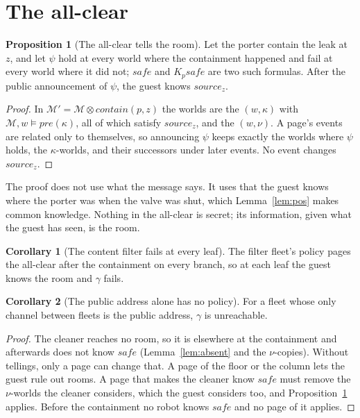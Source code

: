 \documentclass[11pt,a4paper]{article}
\theoremstyle{definition}
\newtheorem{proposition}{Proposition}
\newtheorem{corollary}{Corollary}
\newcommand{\Mod}{\mathcal{M}}
\newcommand{\prd}{\otimes}
\newcommand{\pre}{\mathit{pre}}
\newcommand{\safe}{\mathit{safe}}
\newcommand{\src}[1]{\mathit{source}_{#1}}
\begin{document}
\section{The all-clear}
\label{sec:allclear}

\begin{proposition}[The all-clear tells the room]
\label{prop:allclear}
Let the porter contain the leak at $z$, and let $\psi$ hold at every world
where the containment happened and fail at every world where it did not;
$\safe$ and $K_p\safe$ are two such formulas. After the public announcement of
$\psi$, the guest knows $\src{z}$.
\end{proposition}

\begin{proof}
In $\Mod' = \Mod \prd \mathit{contain}(p, z)$ the worlds are the $(w, \kappa)$
with $\Mod, w \models \pre(\kappa)$, all of which satisfy $\src{z}$, and the
$(w, \nu)$. A page's events are related only to themselves, so announcing
$\psi$ keeps exactly the worlds where $\psi$ holds, the $\kappa$-worlds, and
their successors under later events. No event changes $\src{z}$.
\end{proof}

The proof does not use what the message says. It uses that the guest knows where
the porter was when the valve was shut, which Lemma~\ref{lem:pos} makes common
knowledge. Nothing in the all-clear is secret; its information, given what the
guest has seen, is the room.

\begin{corollary}[The content filter fails at every leaf]
\label{cor:filter}
The filter fleet's policy pages the all-clear after the containment on every
branch, so at each leaf the guest knows the room and $\gamma$ fails.
\end{corollary}

\begin{corollary}[The public address alone has no policy]
\label{cor:paonly}
For a fleet whose only channel between fleets is the public address, $\gamma$
is unreachable.
\end{corollary}

\begin{proof}
The cleaner reaches no room, so it is elsewhere at the containment and
afterwards does not know $\safe$ (Lemma~\ref{lem:absent} and the $\nu$-copies).
Without tellings, only a page can change that. A page of the floor or the column
lets the guest rule out rooms. A page that makes the cleaner know $\safe$ must
remove the $\nu$-worlds the cleaner considers, which the guest considers too, and
Proposition~\ref{prop:allclear} applies. Before the containment no robot knows
$\safe$ and no page of it applies.
\end{proof}
\end{document}
